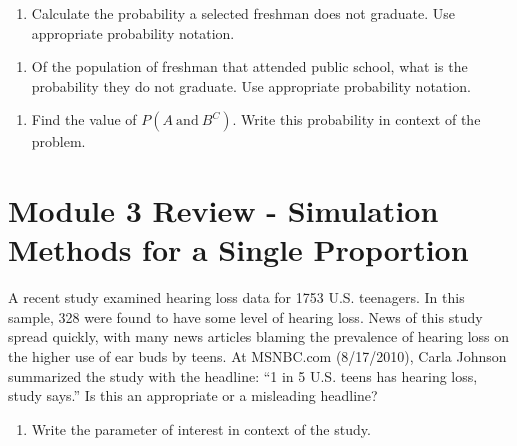 \documentclass[
]{report}
\providecommand{\tightlist}{%
  \setlength{\itemsep}{0pt}\setlength{\parskip}{0pt}}
\begin{document}
\vspace{1in}

\begin{enumerate}
\def\labelenumi{\alph{enumi}.}
\setcounter{enumi}{3}
\tightlist
\item
  Calculate the probability a selected freshman does not graduate. Use appropriate probability notation.
\end{enumerate}

\vspace{1in}

\begin{enumerate}
\def\labelenumi{\alph{enumi}.}
\setcounter{enumi}{4}
\tightlist
\item
  Of the population of freshman that attended public school, what is the probability they do not graduate. Use appropriate probability notation.
\end{enumerate}

\vspace{1in}

\begin{enumerate}
\def\labelenumi{\alph{enumi}.}
\setcounter{enumi}{5}
\tightlist
\item
  Find the value of \(P(A~\text{and}~B^C)\). Write this probability in context of the problem.
\end{enumerate}

\newpage

\section{Module 3 Review - Simulation Methods for a Single Proportion}\label{module-3-review---simulation-methods-for-a-single-proportion}

A recent study examined hearing loss data for 1753 U.S. teenagers. In this sample, 328 were found to have some level of hearing loss. News of this study spread quickly, with many news articles blaming the prevalence of hearing loss on the higher use of ear buds by teens. At MSNBC.com (8/17/2010), Carla Johnson summarized the study with the headline: ``1 in 5 U.S. teens has hearing loss, study says.'' Is this an appropriate or a misleading headline?

\begin{enumerate}
\def\labelenumi{\arabic{enumi}.}
\tightlist
\item
  Write the parameter of interest in context of the study.
\end{enumerate}
\end{document}
